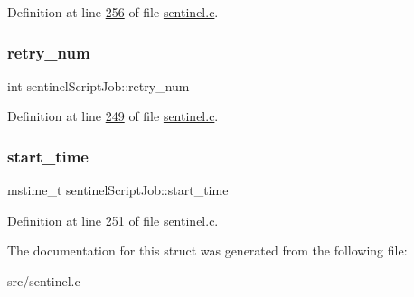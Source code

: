 Definition at line \hyperlink{sentinel_8c_source_l00256}{256} of file \hyperlink{sentinel_8c_source}{sentinel.\+c}.

\mbox{\label{structsentinelScriptJob_a5b4ae5f72e1c4f78d9da89215c09209a}} 
\subsubsection{\texorpdfstring{retry\+\_\+num}{retry\_num}}
{\footnotesize\ttfamily int sentinel\+Script\+Job\+::retry\+\_\+num}



Definition at line \hyperlink{sentinel_8c_source_l00249}{249} of file \hyperlink{sentinel_8c_source}{sentinel.\+c}.

\mbox{\label{structsentinelScriptJob_ad6712c2b32d36dcbed250929223a9875}} 
\subsubsection{\texorpdfstring{start\+\_\+time}{start\_time}}
{\footnotesize\ttfamily mstime\+\_\+t sentinel\+Script\+Job\+::start\+\_\+time}



Definition at line \hyperlink{sentinel_8c_source_l00251}{251} of file \hyperlink{sentinel_8c_source}{sentinel.\+c}.



The documentation for this struct was generated from the following file\+:\begin{DoxyCompactItemize}
\item 
src/sentinel.\+c\end{DoxyCompactItemize}
